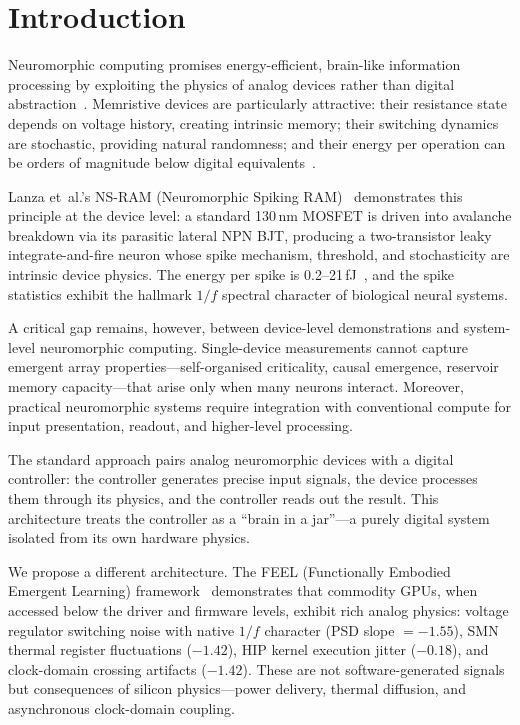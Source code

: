 \documentclass[11pt]{article}
\begin{document}
\twocolumn

\section{Introduction}
\label{sec:intro}

Neuromorphic computing promises energy-efficient, brain-like
information processing by exploiting the physics of analog devices
rather than digital abstraction~\cite{mead1990, indiveri2011,
schuman2022}.  Memristive devices are particularly attractive:
their resistance state depends on voltage history, creating
intrinsic memory; their switching dynamics are stochastic,
providing natural randomness; and their energy per operation can
be orders of magnitude below digital equivalents~\cite{ielmini2018,
lanza2022}.

Lanza et~al.'s NS-RAM (Neuromorphic Spiking RAM)~\cite{lanza2024,
pazos2024nsram} demonstrates this principle at the device level: a
standard 130\,nm MOSFET is driven into avalanche breakdown via its
parasitic lateral NPN BJT, producing a two-transistor leaky
integrate-and-fire neuron whose spike mechanism, threshold, and
stochasticity are intrinsic device physics.  The energy per spike
is 0.2--21\,fJ~\cite{pazos2024nsram}, and the spike statistics
exhibit the hallmark $1/f$ spectral character of biological neural
systems.

A critical gap remains, however, between device-level demonstrations
and system-level neuromorphic computing.  Single-device measurements
cannot capture emergent array properties---self-organised
criticality, causal emergence, reservoir memory capacity---that
arise only when many neurons interact.  Moreover, practical
neuromorphic systems require integration with conventional compute
for input presentation, readout, and higher-level processing.

The standard approach pairs analog neuromorphic devices with a
digital controller: the controller generates precise input signals,
the device processes them through its physics, and the controller
reads out the result.  This architecture treats the controller as a
``brain in a jar''---a purely digital system isolated from its own
hardware physics.

We propose a different architecture.  The FEEL (Functionally
Embodied Emergent Learning) framework~\cite{feel2026} demonstrates
that commodity GPUs, when accessed below the driver and firmware
levels, exhibit rich analog physics: voltage regulator switching
noise with native $1/f$ character (PSD slope $= -1.55$), SMN
thermal register fluctuations ($-1.42$), HIP kernel execution
jitter ($-0.18$), and clock-domain crossing artifacts ($-1.42$).
These are not software-generated signals but consequences of
silicon physics---power delivery, thermal diffusion, and
asynchronous clock-domain coupling.
\end{document}

